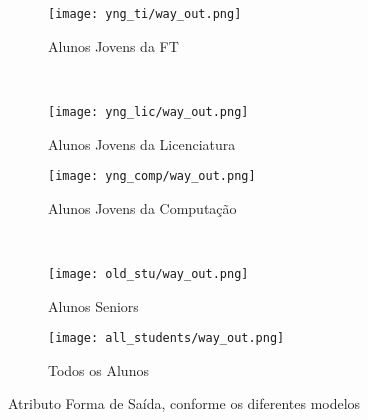 \clearpage
\begin{figure}[!ht]
    \centering
    \begin{subfigure}[b]{0.48\textwidth}
        \centering
        \texttt{[image: yng\_ti/way\_out.png]}
        \caption{Alunos Jovens da FT}
    \end{subfigure}
    ~
    \begin{subfigure}[b]{0.48\textwidth}
        \centering
        \texttt{[image: yng\_lic/way\_out.png]}
        \caption{Alunos Jovens da Licenciatura}
    \end{subfigure}

    \begin{subfigure}[b]{0.48\textwidth}
        \centering
        \texttt{[image: yng\_comp/way\_out.png]}
        \caption{Alunos Jovens da Computação}
    \end{subfigure}
    ~
    \begin{subfigure}[b]{0.48\textwidth}
        \centering
        \texttt{[image: old\_stu/way\_out.png]}
        \caption{Alunos Seniors}
    \end{subfigure}

    \begin{subfigure}[b]{0.48\textwidth}
        \centering
        \texttt{[image: all\_students/way\_out.png]}
        \caption{Todos os Alunos}
    \end{subfigure}
    \caption{Atributo Forma de Saída, conforme os diferentes modelos}
\end{figure}

